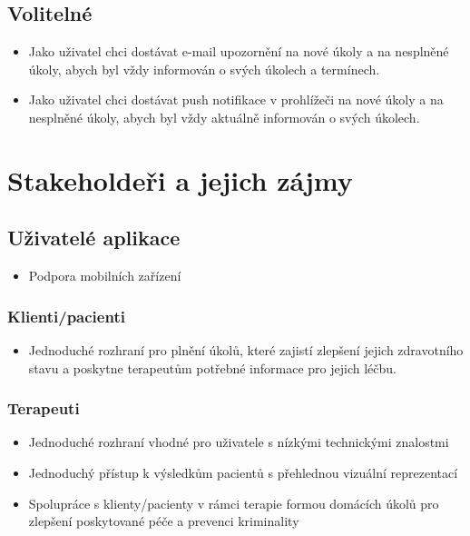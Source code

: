 \subsection{Volitelné}\label{subsec:volitelnuxe9}

\begin{itemize}
  \item
  Jako uživatel chci dostávat e-mail upozornění na nové úkoly a na nesplněné úkoly, abych byl vždy informován o svých úkolech a termínech.
  \item
  Jako uživatel chci dostávat push notifikace v prohlížeči na nové úkoly a na nesplněné úkoly, abych byl vždy aktuálně informován o svých úkolech.
\end{itemize}

\section{Stakeholdeři a jejich zájmy}\label{sec:stakeholderi}

\subsection*{Uživatelé aplikace}\label{subsec:uzivatele-aplikace}

\begin{itemize}
  \item
  Podpora mobilních zařízení
\end{itemize}

\subsubsection*{Klienti/pacienti}\label{subsubsec:klientipacienti}

\begin{itemize}
  \item
  Jednoduché rozhraní pro plnění úkolů, které zajistí zlepšení jejich
  zdravotního stavu a poskytne terapeutům potřebné informace pro jejich
  léčbu.
\end{itemize}

\subsubsection*{Terapeuti}\label{subsubsec:terapeuti}

\begin{itemize}
  \item
  Jednoduché rozhraní vhodné pro uživatele s nízkými technickými
  znalostmi
  \item
  Jednoduchý přístup k výsledkům pacientů s přehlednou vizuální
  reprezentací
  \item
  Spolupráce s klienty/pacienty v rámci terapie formou domácích úkolů
  pro zlepšení poskytované péče a prevenci kriminality
\end{itemize}

